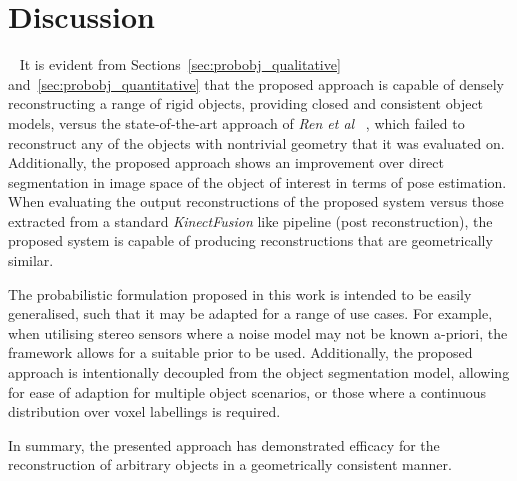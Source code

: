 \section{Discussion}
~\label{sec:probobj_discussion}
It is evident from Sections~\ref{sec:probobj_qualitative} and~\ref{sec:probobj_quantitative} 
that the proposed approach is capable of densely reconstructing a range of rigid objects, providing 
closed and consistent object models, versus the state-of-the-art approach of \textit{Ren et al} 
~\cite{Ren2013}, which failed to reconstruct any of the objects with nontrivial geometry that it 
was evaluated on. Additionally, the proposed approach shows an improvement over direct segmentation 
in image space of the object of interest in terms of pose estimation. When evaluating the output 
reconstructions of the proposed system versus those extracted from a standard \textit{KinectFusion} 
like pipeline (post reconstruction), the proposed system is capable of producing reconstructions that 
are geometrically similar.

The probabilistic formulation proposed in this work is intended to be easily generalised, such that 
it may be adapted for a range of use cases. For example, when utilising stereo sensors where a noise 
model may not be known a-priori, the framework allows for a suitable prior to be used. Additionally, 
the proposed approach is intentionally decoupled from the object segmentation model, allowing for 
ease of adaption for multiple object scenarios, or those where a continuous distribution over voxel 
labellings is required.

In summary, the presented approach has demonstrated efficacy for the reconstruction of arbitrary 
objects in a geometrically consistent manner.